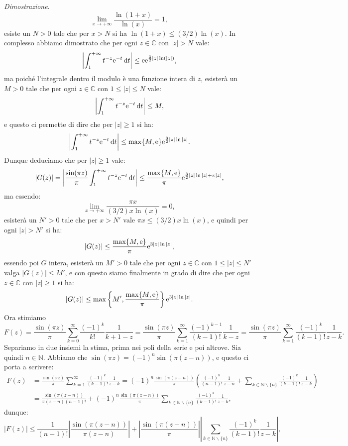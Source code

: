 \documentclass[11pt]{book}
\makeatletter
\theoremstyle{Definizione}
\theoremstyle{TeoremaProposizioneLemmaCorollarioCongettura}
\theoremstyle{OsservazioneNotaEsempio}
\renewenvironment{proof}[1][\proofname]{\par
  \normalfont \topsep6\p@\@plus6\p@\relax
  \trivlist
  \item[\hskip\labelsep
        \itshape
    #1\@addpunct{.}]\ignorespaces
}{%
  \endtrivlist\@endpefalse
}
\renewenvironment{proof}{\textsl{Dimostrazione}.}{}
\newcommand{\N}{\mathbb{N}}
\newcommand{\C}{\mathbb{C}}
\newcommand{\tolto}{\smallsetminus}
\newcommand{\e}{\textup{e}}
\renewcommand{\d}{\mathrm{d}}
\newcommand{\dt}{\,\d t}
\makeatother
\begin{document}
\begin{boxpro}
\begin{proof}
$$
\lim_{ x \to +\infty} \frac{\ln(1+x)}{\ln(x)} = 1,
$$
esiste un $N > 0$ tale che per $x > N$ si ha $\ln(1+x) \leq (3/2)\ln(x)$. In complesso abbiamo dimostrato che per ogni $z\in \C$ con $|z| >N$ vale:
$$
\left|\int_{1}^{+\infty} t^{-z}\e^{-t}\dt\right| \leq \e \e^{\frac{3}{2}|z|\ln(|z|)},
$$
ma poiché l'integrale dentro il modulo è una funzione intera di $z$, esisterà un $M > 0$ tale che per ogni $z\in \C$ con $1\leq |z| \leq N$ vale:
$$
\left|\int_{1}^{+\infty} t^{-z}\e^{-t}\dt\right| \leq M,
$$
e questo ci permette di dire che per $|z|\geq 1$ si ha:
$$
\left|\int_{1}^{+\infty} t^{-z}\e^{-t}\dt\right|\leq \max\{M,\e\}\e^{\frac{3}{2}|z|\ln|z|}.
$$
Dunque deduciamo che per $|z|\geq 1$ vale:
$$
|G(z)| = \left|\frac{\sin(\pi z)}{\pi}\int_{1}^{+\infty} t^{-z}\e^{-t}\dt\right| \leq \frac{\max\{M,\e\}}{\pi}\e^{\frac{3}{2}|z|\ln|z|+\pi |z|},
$$
ma essendo:
$$
\lim_{x \to +\infty} \frac{\pi x}{(3/2)x\ln(x)} = 0,
$$
esisterà un $N' > 0$ tale che per $x > N'$ vale $\pi x \leq (3/2)x\ln(x)$, e quindi per ogni $|z| > N'$ si ha:
$$
|G(z)| \leq \frac{\max\{M,\e\}}{\pi}\e^{3|z|\ln|z|},
$$
essendo poi $G$ intera, esisterà un $M'>0$ tale che per ogni $z\in \C$ con $1\leq |z|\leq N'$ valga $|G(z)| \leq M'$, e con questo siamo finalmente in grado di dire che per ogni $z\in \C$ con $|z|\geq 1$ si ha:
$$
|G(z)| \leq \max\left\{M',\frac{\max\{M,\e\}}{\pi}\right\}\e^{3|z|\ln|z|}.
$$
Ora stimiamo
$$
F(z) = \frac{\sin(\pi z)}{\pi}\sum_{k = 0}^\infty \frac{(-1)^k}{k!}\frac{1}{k+1-z} = \frac{\sin(\pi z)}{\pi}\sum_{k = 1}^\infty \frac{(-1)^{k-1}}{(k-1)!}\frac{1}{k-z} = \frac{\sin(\pi z)}{\pi}\sum_{k = 1}^\infty \frac{(-1)^k}{(k-1)!}\frac{1}{z-k}.
$$
Separiamo in due insiemi la stima, prima nei poli della serie e poi altrove. Sia quindi $n\in \N$. Abbiamo che $\sin(\pi z) = (-1)^n \sin(\pi(z-n))$, e questo ci porta a scrivere:
\begin{align*}
F(z) &= \frac{\sin(\pi z)}{\pi}\sum_{k = 1}^\infty \frac{(-1)^k}{(k-1)!}\frac{1}{z-k} = (-1)^{n}\frac{\sin(\pi (z-n))}{\pi} \left(\frac{(-1)^{n}}{(n-1)!}\frac{1}{z-n}+\sum_{k\in \N\tolto \{n\}} \frac{(-1)^{k}}{(k-1)!}\frac{1}{z-k}\right)\\
&= \frac{\sin(\pi (z-n))}{\pi(z-n)(n-1)!}+ (-1)^n\frac{\sin(\pi(z-n))}{\pi}\sum_{k\in \N\tolto \{n\}} \frac{(-1)^k}{(k-1)!}\frac{1}{z-k},
\end{align*}
dunque:
\begin{equation}\label{eq:pro:StimaModuloInversoGammaModuloFSuiPoli}
|F(z)| \leq \frac{1}{(n-1)!}\left|\frac{\sin(\pi (z-n))}{\pi(z-n)}\right|+ \left|\frac{\sin(\pi(z-n))}{\pi}\right|\left|\sum_{k\in \N\tolto \{n\}} \frac{(-1)^k}{(k-1)!}\frac{1}{z-k}\right|,

\end{equation}
\end{proof}
\end{boxpro}
\end{document}
